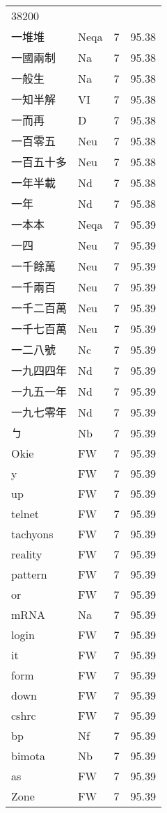 \documentclass[twocolumn]{book}
\begin{document}
\begin{supertabular}{llrr}
38200\\
一堆堆 & Neqa & 7 &  95.38\\
一國兩制 & Na & 7 &  95.38\\
一般生 & Na & 7 &  95.38\\
一知半解 & VI & 7 &  95.38\\
一而再 & D & 7 &  95.38\\
一百零五 & Neu & 7 &  95.38\\
一百五十多 & Neu & 7 &  95.38\\
一年半載 & Nd & 7 &  95.38\\
一年 & Nd & 7 &  95.38\\
一本本 & Neqa & 7 &  95.39\\
一四 & Neu & 7 &  95.39\\
一千餘萬 & Neu & 7 &  95.39\\
一千兩百 & Neu & 7 &  95.39\\
一千二百萬 & Neu & 7 &  95.39\\
一千七百萬 & Neu & 7 &  95.39\\
一二八號 & Nc & 7 &  95.39\\
一九四四年 & Nd & 7 &  95.39\\
一九五一年 & Nd & 7 &  95.39\\
一九七零年 & Nd & 7 &  95.39\\
ㄅ & Nb & 7 &  95.39\\
Οkie & FW & 7 &  95.39\\
y & FW & 7 &  95.39\\
up & FW & 7 &  95.39\\
telnet & FW & 7 &  95.39\\
tachyons & FW & 7 &  95.39\\
reality & FW & 7 &  95.39\\
pattern & FW & 7 &  95.39\\
or & FW & 7 &  95.39\\
mRNA & Na & 7 &  95.39\\
login & FW & 7 &  95.39\\
it & FW & 7 &  95.39\\
form & FW & 7 &  95.39\\
down & FW & 7 &  95.39\\
cshrc & FW & 7 &  95.39\\
bp & Nf & 7 &  95.39\\
bimota & Nb & 7 &  95.39\\
as & FW & 7 &  95.39\\
Zone & FW & 7 &  95.39\\

\end{supertabular}
\end{document}
